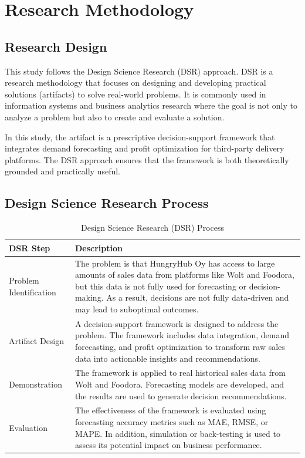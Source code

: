 \section{Research Methodology}

\subsection{Research Design}

This study follows the Design Science Research (DSR) approach. DSR is a research methodology that focuses on designing and developing practical solutions (artifacts) to solve real-world problems. It is commonly used in information systems and business analytics research where the goal is not only to analyze a problem but also to create and evaluate a solution. 

In this study, the artifact is a prescriptive decision-support framework that integrates demand forecasting and profit optimization for third-party delivery platforms. The DSR approach ensures that the framework is both theoretically grounded and practically useful.


\subsection{Design Science Research Process}

\begin{table}[h]
\centering
\begin{tabular}{|p{4cm}|p{10cm}|}
\hline
\textbf{DSR Step} & \textbf{Description} \\
\hline
Problem Identification & The problem is that HungryHub Oy has access to large amounts of sales data from platforms like Wolt and Foodora, but this data is not fully used for forecasting or decision-making. As a result, decisions are not fully data-driven and may lead to suboptimal outcomes. \\
\hline
Artifact Design & A decision-support framework is designed to address the problem. The framework includes data integration, demand forecasting, and profit optimization to transform raw sales data into actionable insights and recommendations. \\
\hline
Demonstration & The framework is applied to real historical sales data from Wolt and Foodora. Forecasting models are developed, and the results are used to generate decision recommendations. \\
\hline
Evaluation & The effectiveness of the framework is evaluated using forecasting accuracy metrics such as MAE, RMSE, or MAPE. In addition, simulation or back-testing is used to assess its potential impact on business performance. \\
\hline
\end{tabular}
\caption{Design Science Research (DSR) Process}
\end{table}

